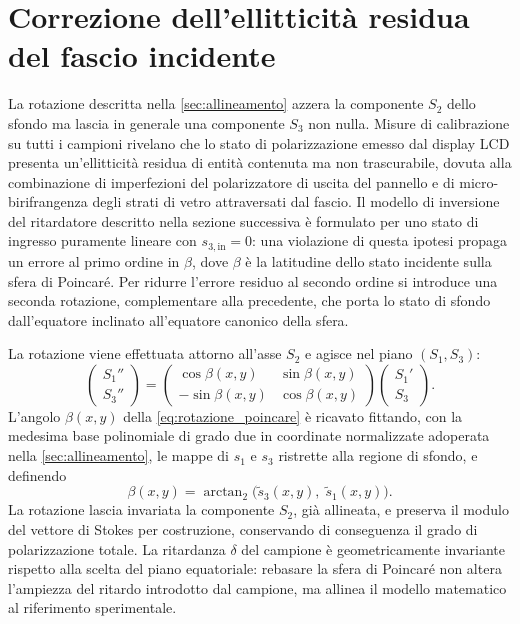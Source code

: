 \section{Correzione dell'ellitticità residua del fascio incidente}
\label{sec:ellitticita}

La rotazione descritta nella \cref{sec:allineamento} azzera la componente $S_2$ dello sfondo ma lascia in generale una componente $S_3$ non nulla. Misure di calibrazione su tutti i campioni rivelano che lo stato di polarizzazione emesso dal display LCD presenta un'ellitticità residua di entità contenuta ma non trascurabile, dovuta alla combinazione di imperfezioni del polarizzatore di uscita del pannello e di micro-birifrangenza degli strati di vetro attraversati dal fascio. Il modello di inversione del ritardatore descritto nella sezione successiva è formulato per uno stato di ingresso puramente lineare con $s_{3,\mathrm{in}} = 0$: una violazione di questa ipotesi propaga un errore al primo ordine in $\beta$, dove $\beta$ è la latitudine dello stato incidente sulla sfera di Poincaré. Per ridurre l'errore residuo al secondo ordine si introduce una seconda rotazione, complementare alla precedente, che porta lo stato di sfondo dall'equatore inclinato all'equatore canonico della sfera.

La rotazione viene effettuata attorno all'asse $S_2$ e agisce nel piano $(S_1, S_3)$:
\begin{equation}
    \begin{pmatrix} S_1'' \\ S_3'' \end{pmatrix} = \begin{pmatrix} \cos\beta(x, y) & \sin\beta(x, y) \\ -\sin\beta(x, y) & \cos\beta(x, y) \end{pmatrix} \begin{pmatrix} S_1' \\ S_3 \end{pmatrix}.
    \label{eq:rotazione_poincare}
\end{equation}
L'angolo $\beta(x, y)$ della \cref{eq:rotazione_poincare} è ricavato fittando, con la medesima base polinomiale di grado due in coordinate normalizzate adoperata nella \cref{sec:allineamento}, le mappe di $s_{1}$ e $s_{3}$ ristrette alla regione di sfondo, e definendo
\begin{equation}
    \beta(x, y) = \arctan_2\!\bigl(\tilde{s}_{3}(x, y),\; \tilde{s}_{1}(x, y)\bigr).
    \label{eq:beta_poincare}
\end{equation}
La rotazione lascia invariata la componente $S_2$, già allineata, e preserva il modulo del vettore di Stokes per costruzione, conservando di conseguenza il grado di polarizzazione totale. La ritardanza $\delta$ del campione è geometricamente invariante rispetto alla scelta del piano equatoriale: rebasare la sfera di Poincaré non altera l'ampiezza del ritardo introdotto dal campione, ma allinea il modello matematico al riferimento sperimentale.

